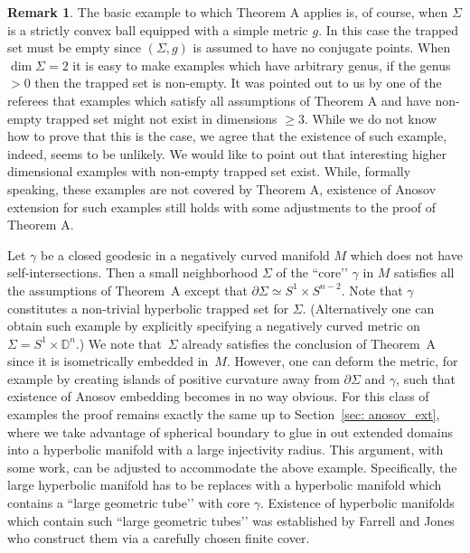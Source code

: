 \documentclass[10pt]{amsart}
\theoremstyle{definition}
\newtheorem*{remark*}{Remark}
\renewcommand{\>}{{\rangle}}
\newcommand{\<}{{\langle}}
\begin{document}
\begin{remark*}
The basic example to which Theorem A applies is, of course, when $\Sigma$ is a strictly convex ball equipped with a simple metric $g$. In this case the trapped set must be empty since $(\Sigma, g)$ is assumed to have no conjugate points. When $\dim \Sigma=2$ it is easy to make examples which have arbitrary genus, if the genus $>0$ then the trapped set is non-empty. It was pointed out to us by one of the referees that examples which satisfy all assumptions of Theorem A and have non-empty trapped set might not exist in dimensions $\ge 3$. While we do not know how to prove that this is the case, we agree that the existence of such example, indeed, seems to be unlikely. We would like to point out that interesting higher dimensional examples with non-empty trapped set exist. While, formally speaking, these examples are not covered by Theorem A, existence of Anosov extension for such examples still holds with some adjustments to the proof of Theorem A.

Let $\gamma$ be a closed geodesic in a negatively curved manifold $M$ which does not have self-intersections. Then a small neighborhood $\Sigma$ of the ``core’’ $\gamma$ in $M$ satisfies all the assumptions of Theorem~A except that $\partial\Sigma\simeq S^1\times S^{n-2}$. Note that $\gamma$ constitutes a non-trivial hyperbolic trapped set for $\Sigma$. (Alternatively one can obtain such example by explicitly specifying a negatively curved metric on $\Sigma=S^1\times\mathbb D^n$.) We note that~$\Sigma$ already satisfies the conclusion of Theorem~A since it is isometrically embedded in~$M$. However, one can deform the metric, for example by creating islands of positive curvature away from $\partial\Sigma$ and $\gamma$, such that existence of Anosov embedding becomes in no way obvious. For this class of examples the proof remains exactly the same up to Section~\ref{sec: anosov_ext}, where we take advantage of spherical boundary to glue in out extended domains into a hyperbolic manifold with a large injectivity radius. This argument, with some work, can be adjusted to accommodate the above example. Specifically, the large hyperbolic manifold has to be replaces with a hyperbolic manifold which contains a ``large geometric tube’’ with core $\gamma$. Existence of hyperbolic manifolds which contain such ``large geometric tubes’’ was established by Farrell and Jones~\cite[Cor.\,3.3]{FJ93} who construct them via a carefully chosen finite cover.
\end{remark*}
\end{document}
